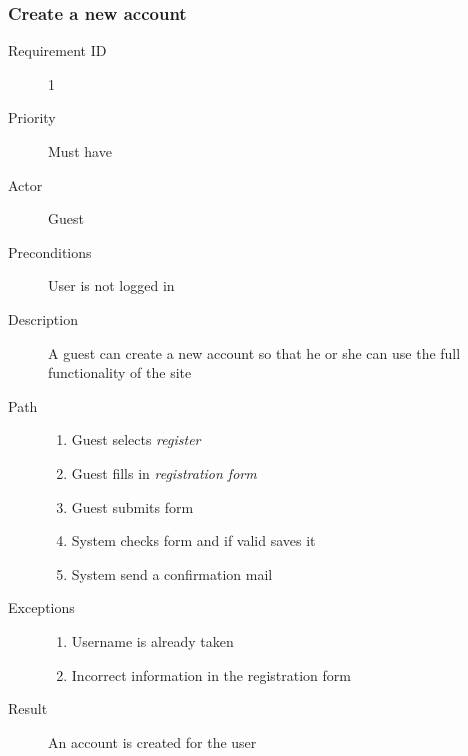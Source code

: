 		\subsubsection{Create a new account} 
			\begin{description}
				\item[Requirement ID] 1
				\item[Priority] Must have
				\item[Actor] Guest
				\item[Preconditions] User is not logged in
				\item[Description]
				A guest can create a new account so that he or she 
				can use the full functionality of the site
 				\item[Path]
 					\begin{enumerate}
						\item Guest selects \emph{register}
						\item Guest fills in \emph{registration form}
						\item Guest submits form
						\item System checks form and if valid saves it
						\item System send a confirmation mail 
					\end{enumerate}
				\item[Exceptions]
					\begin{enumerate}
						\item Username is already taken
						\item Incorrect information in the registration form
					\end{enumerate}
				\item[Result] An account is created for the user
			\end{description}
